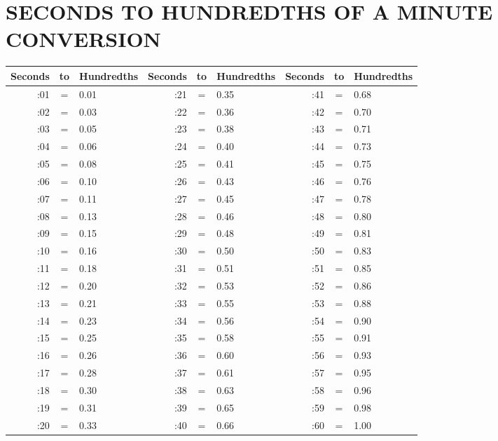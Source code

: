 \section{SECONDS TO HUNDREDTHS OF A MINUTE CONVERSION}
\begin{tabular}{ |rcl|rcl|rcl| }
  \hline
  Seconds & to & Hundredths & Seconds & to & Hundredths & Seconds & to & Hundredths \\
  \hline
  :01 & = & 0.01 & :21 & = & 0.35 & :41 & = & 0.68 \\
  :02 & = & 0.03 & :22 & = & 0.36 & :42 & = & 0.70 \\
  :03 & = & 0.05 & :23 & = & 0.38 & :43 & = & 0.71 \\
  :04 & = & 0.06 & :24 & = & 0.40 & :44 & = & 0.73 \\
  :05 & = & 0.08 & :25 & = & 0.41 & :45 & = & 0.75 \\
  \hline
  :06 & = & 0.10 & :26 & = & 0.43 & :46 & = & 0.76 \\
  :07 & = & 0.11 & :27 & = & 0.45 & :47 & = & 0.78 \\
  :08 & = & 0.13 & :28 & = & 0.46 & :48 & = & 0.80 \\
  :09 & = & 0.15 & :29 & = & 0.48 & :49 & = & 0.81 \\
  :10 & = & 0.16 & :30 & = & 0.50 & :50 & = & 0.83 \\
  \hline
  :11 & = & 0.18 & :31 & = & 0.51 & :51 & = & 0.85 \\
  :12 & = & 0.20 & :32 & = & 0.53 & :52 & = & 0.86 \\
  :13 & = & 0.21 & :33 & = & 0.55 & :53 & = & 0.88 \\
  :14 & = & 0.23 & :34 & = & 0.56 & :54 & = & 0.90 \\
  :15 & = & 0.25 & :35 & = & 0.58 & :55 & = & 0.91 \\
  \hline
  :16 & = & 0.26 & :36 & = & 0.60 & :56 & = & 0.93 \\
  :17 & = & 0.28 & :37 & = & 0.61 & :57 & = & 0.95 \\
  :18 & = & 0.30 & :38 & = & 0.63 & :58 & = & 0.96 \\
  :19 & = & 0.31 & :39 & = & 0.65 & :59 & = & 0.98 \\
  :20 & = & 0.33 & :40 & = & 0.66 & :60 & = & 1.00 \\
  \hline
\end{tabular}